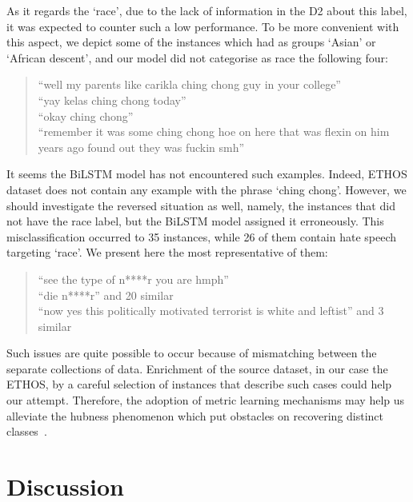 \documentclass{article}
\begin{document}
As it regards the `race', due to the lack of information in the D2 about this label, it was expected to counter such a low performance. To be more convenient with this aspect, we depict some of the instances which had as groups `Asian' or `African descent', and our model did not categorise as race the following four:

\begin{quote}
    ``well my parents like carikla ching chong guy in your college'' \\
    ``yay kelas ching chong today''\\ 
    ``okay ching chong''\\
    ``remember it was some ching chong hoe on here that was flexin on him years ago found out they was fuckin smh''
\end{quote}

It seems the BiLSTM model has not encountered such examples. Indeed, ETHOS dataset does not contain any example with the phrase `ching chong'. However, we should investigate the reversed situation as well, namely, the instances that did not have the race label, but the BiLSTM model assigned it erroneously. This misclassification occurred to 35 instances, while 26 of them contain hate speech targeting `race'. We present here the most representative of them:

\begin{quote}
    ``see the type of n****r you are hmph''\\ 
    ``die n****r'' and 20 similar\\ 
    ``now yes this politically motivated terrorist is white and leftist'' and 3 similar
\end{quote}

Such issues are quite possible to occur because of mismatching between the separate collections of data. Enrichment of the source dataset, in our case the ETHOS, by a careful selection of instances that describe such cases could help our attempt. Therefore, the adoption of metric learning mechanisms may help us alleviate the hubness phenomenon which put obstacles on recovering distinct classes~\cite{DBLP:conf/cvpr/KimKCK20}.

\section{Discussion}
\end{document}
